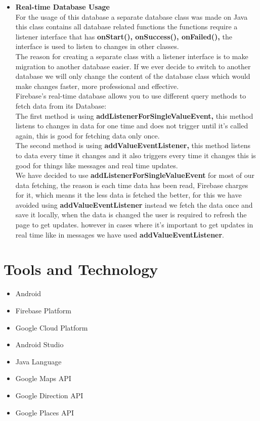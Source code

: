 \begin{itemize}
\item \textbf{Real-time Database Usage }\\

For the usage of this database a separate database class was made on Java this class contains all database related functions the functions require a listener interface that has \textbf{onStart(), onSuccess(), onFailed(),} the interface is used to listen to changes in other classes.\\

The reason for creating a separate class with a listener interface is to make migration to another database easier. If we ever decide to switch to another database we will only change the content of the database class which would make changes faster, more professional and effective.\\

Firebase’s real-time database allows you to use different query methods to fetch data from its Database:\\
The first method is using \textbf{addListenerForSingleValueEvent,} this method listens to changes 
in data for one time and does not trigger until it’s called again, this is good for fetching data only once.\\

The second method is using \textbf{addValueEventListener,} this method listens to data every time it changes and it also triggers every time it changes this is good for things like messages and real time updates.\\

We have decided to use \textbf{addListenerForSingleValueEvent} for most of our data fetching, the reason is each time data has been read, Firebase charges for it, which means it the less data is fetched the better, for this we have avoided using\textbf{ addValueEventListener} instead we fetch the data once and save it locally, when the data is changed the user is required to refresh the page to get updates. however in cases where it’s important to get updates in real time like in messages we have used \textbf{addValueEventListener}. 
\end{itemize}

\section{Tools and Technology}
\begin{itemize}
\item Android
\item Firebase Platform
\item Google Cloud Platform
\item Android Studio
\item Java Language
\item Google Maps API
\item Google Direction API
\item Google Places API
\end{itemize}

